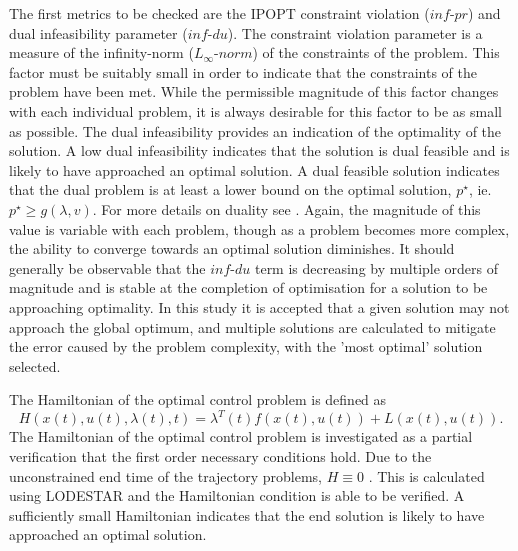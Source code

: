 The first metrics to be checked are the IPOPT constraint violation ($inf\textrm{-}pr$) and dual infeasibility parameter ($inf\textrm{-}du$)\cite{Kawajir2010}. The constraint violation parameter is a measure of the infinity-norm ($L_\infty\textrm{-}norm$) of the constraints of the problem\cite{Kawajir2010}. This factor must be suitably small in order to indicate that the constraints of the problem have been met. While the permissible magnitude of this factor changes with each individual problem, it is always desirable for this factor to be as small as possible. The dual infeasibility provides an indication of the optimality of the solution. A low dual infeasibility indicates that the solution is dual feasible and is likely to have approached an optimal solution. A dual feasible solution indicates that the dual problem is at least a lower bound on the optimal solution, $p^\star$, ie. $p^\star \geq g(\lambda,v)$. For more details on duality see \cite{Hindi2006}.
 Again, the magnitude of this value is variable with each problem, though as a problem becomes more complex, the ability to converge towards an optimal solution diminishes. It should generally be observable that the $inf\textrm{-}du$ term is decreasing by multiple orders of magnitude and is stable at the completion of optimisation for a solution to be approaching optimality. In this study it is accepted that a given solution may not approach the global optimum, and multiple solutions are calculated to mitigate the error caused by the problem complexity, with the 'most optimal' solution selected. 


The Hamiltonian of the optimal control problem is defined as 
\begin{equation}
H(x(t),u(t),\lambda(t),t) = \lambda^T(t)f(x(t),u(t)) + L(x(t),u(t)).
\end{equation}
The Hamiltonian of the optimal control problem is investigated as a partial verification that the first order necessary conditions hold. Due to the unconstrained end time of the trajectory problems, $H\equiv 0 $ \cite{Pucci2007}. 
This is calculated using LODESTAR and the Hamiltonian condition is able to be verified. A sufficiently small Hamiltonian indicates that the end solution is likely to have approached an optimal solution.



